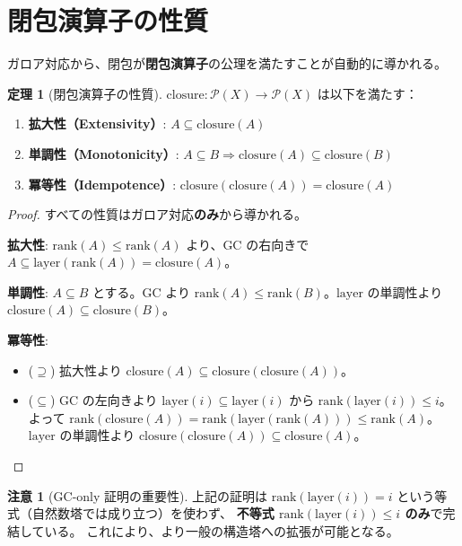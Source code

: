 \documentclass[a4paper,11pt]{ltjsarticle}
\theoremstyle{definition}
\newtheorem{theorem}[definition]{定理}
\newtheorem{remark}[definition]{注意}
\newcommand{\layer}{\mathrm{layer}}
\newcommand{\rank}{\mathrm{rank}}
\newcommand{\closure}{\mathrm{closure}}
\begin{document}
\section{閉包演算子の性質}\label{sec:closure-operator}

ガロア対応から、閉包が\textbf{閉包演算子}の公理を満たすことが自動的に導かれる。

\begin{theorem}[閉包演算子の性質]
$\closure : \mathcal{P}(X) \to \mathcal{P}(X)$ は以下を満たす：
\begin{enumerate}
  \item \textbf{拡大性（Extensivity）}: $A \subseteq \closure(A)$
  \item \textbf{単調性（Monotonicity）}: $A \subseteq B \Rightarrow \closure(A) \subseteq \closure(B)$
  \item \textbf{冪等性（Idempotence）}: $\closure(\closure(A)) = \closure(A)$
\end{enumerate}
\end{theorem}

\begin{proof}
すべての性質はガロア対応\textbf{のみ}から導かれる。

\textbf{拡大性}: $\rank(A) \le \rank(A)$ より、GC の右向きで $A \subseteq \layer(\rank(A)) = \closure(A)$。

\textbf{単調性}: $A \subseteq B$ とする。GC より
$\rank(A) \le \rank(B)$。$\layer$ の単調性より $\closure(A) \subseteq \closure(B)$。

\textbf{冪等性}: 
\begin{itemize}
  \item ($\supseteq$) 拡大性より $\closure(A) \subseteq \closure(\closure(A))$。
  \item ($\subseteq$) GC の左向きより $\layer(i) \subseteq \layer(i)$ から
    $\rank(\layer(i)) \le i$。よって
    $\rank(\closure(A)) = \rank(\layer(\rank(A))) \le \rank(A)$。
    $\layer$ の単調性より $\closure(\closure(A)) \subseteq \closure(A)$。
\end{itemize}
\end{proof}

\begin{remark}[GC-only 証明の重要性]
上記の証明は $\rank(\layer(i)) = i$ という等式（自然数塔では成り立つ）を使わず、
\textbf{不等式 $\rank(\layer(i)) \le i$ のみ}で完結している。
これにより、より一般の構造塔への拡張が可能となる。
\end{remark}
\end{document}
